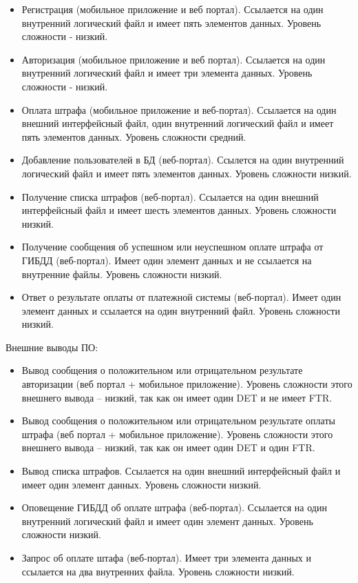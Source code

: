 \documentclass[a4paper,14pt]{article}
\begin{document}
\begin{itemize}
    \item Регистрация (мобильное приложение и веб портал). Ссылается на один внутренний логический файл и имеет пять элементов данных. Уровень сложности - низкий.
    \item Авторизация (мобильное приложение и веб портал). Ссылается на один внутренний логический файл и имеет три элемента данных. Уровень сложности - низкий.
    \item Оплата штрафа (мобильное приложение и веб-портал). Ссылается на один внешний интерфейсный файл, один внутренний логический файл и имеет пять элементов данных. Уровень сложности средний.
    \item Добавление пользователей в БД (веб-портал). Ссылется на один внутренний логический файл и имеет пять элементов данных. Уровень сложности низкий.
    \item Получение списка штрафов (веб-портал). Ссылается на один внешний интерфейсный файл и имеет шесть элементов данных. Уровень сложности низкий.
    \item Получение сообщения об успешном или неуспешном оплате штрафа от ГИБДД (веб-портал). Имеет один элемент данных и не ссылается на внутренние файлы. Уровень сложности низкий.
    \item Ответ о результате оплаты от платежной системы (веб-портал). Имеет один элемент данных и ссылается на один внутренний файл. Уровень сложности низкий.
\end{itemize}

Внешние выводы ПО:

\begin{itemize}
    \item Вывод сообщения о положительном или отрицательном результате авторизации (веб портал + мобильное приложение). Уровень  сложности  этого внешнего вывода – низкий, так как он имеет один DET и не имеет FTR.
    \item Вывод сообщения о положительном или отрицательном результате оплаты штрафа (веб портал + мобильное приложение). Уровень  сложности  этого внешнего вывода – низкий, так как он имеет один DET и один FTR.
    \item Вывод списка штрафов.  Ссылается на один внешний интерфейсный файл и имеет один элемент данных. Уровень сложности низкий.
    \item Оповещение ГИБДД об оплате штрафа (веб-портал). Ссылается на один внутренний логический файл и имеет один элемент данных. Уровень сложности низкий.
    \item Запрос об оплате штафа (веб-портал). Имеет три элемента данных и ссылается на два внутренних файла. Уровень сложности низкий.
\end{itemize}
\end{document}
